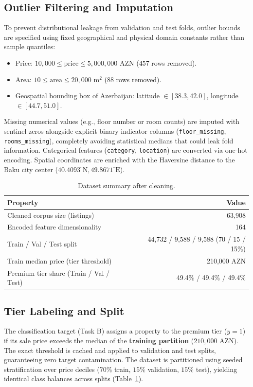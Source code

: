 \documentclass[10pt,twocolumn,a4paper]{article}
\begin{document}
\subsection{Outlier Filtering and Imputation}
To prevent distributional leakage from validation and test folds, outlier bounds are specified using fixed geographical and physical domain constants rather than sample quantiles:
\begin{itemize}
    \item Price: $10,000 \le \text{price} \le 5,000,000$ AZN ($457$ rows removed).
    \item Area: $10 \le \text{area} \le 20,000\text{ m}^2$ ($88$ rows removed).
    \item Geospatial bounding box of Azerbaijan: latitude $\in [38.3, 42.0]$, longitude $\in [44.7, 51.0]$.
\end{itemize}
Missing numerical values (e.g., floor number or room counts) are imputed with sentinel zeros alongside explicit binary indicator columns (\texttt{floor\_missing}, \texttt{rooms\_missing}), completely avoiding statistical medians that could leak fold information. Categorical features (\texttt{category}, \texttt{location}) are converted via one-hot encoding. Spatial coordinates are enriched with the Haversine distance to the Baku city center ($40.4093^\circ\text{N}, 49.8671^\circ\text{E}$).

\begin{table}[t]
  \centering
  \caption{Dataset summary after cleaning.}
  \label{tab:data}
  \begin{tabular}{@{}lr@{}}
    \toprule
    Property & Value \\
    \midrule
    Cleaned corpus size (listings) & 63,908 \\
    Encoded feature dimensionality & 164 \\
    Train / Val / Test split & 44,732 / 9,588 / 9,588 (70 / 15 / 15\%) \\
    Train median price (tier threshold) & 210,000 AZN \\
    Premium tier share (Train / Val / Test) & 49.4\% / 49.4\% / 49.4\% \\
    \bottomrule
  \end{tabular}
\end{table}

\subsection{Tier Labeling and Split}
The classification target (Task B) assigns a property to the premium tier ($y=1$) if its sale price exceeds the median of the \textbf{training partition} ($210,000$ AZN). The exact threshold is cached and applied to validation and test splits, guaranteeing zero target contamination. The dataset is partitioned using seeded stratification over price deciles ($70\%$ train, $15\%$ validation, $15\%$ test), yielding identical class balances across splits (Table~\ref{tab:data}).
\end{document}
